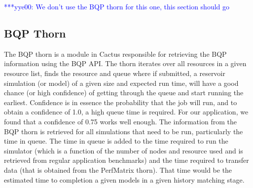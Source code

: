 \documentclass[conference,final]{IEEEtran}
\newcommand{\yyenote}[1]{ {\textcolor{blue} { ***yye00: #1 }}}
\begin{document}


\yyenote{We don't use the BQP thorn for this one, this section should go
}
\subsection{BQP Thorn}
The BQP thorn is a module in Cactus responsible for retrieving the BQP
information using the BQP API. The thorn iterates over all resources
in a given resource list, finds the resource and queue where if
submitted, a reservoir simulation (or model) of a given size and
expected run time, will have a good chance (or high confidence) of
getting through the queue and start running the earliest. Confidence
is in essence the probability that the job will run, and to obtain a
confidence of 1.0, a high queue time is required. For our application,
we found that a confidence of 0.75 works well enough. The information from the BQP thorn is retrieved for all simulations
that need to be run, particularly the time in queue. The time in queue
is added to the time required to run the simulator (which is a
function of the number of nodes and resource used and is retrieved
from regular application benchmarks) and the time required to transfer
data (that is obtained from the PerfMatrix thorn).  That time would be
the estimated time to completion a given models in a given history
matching stage.
\end{document}
